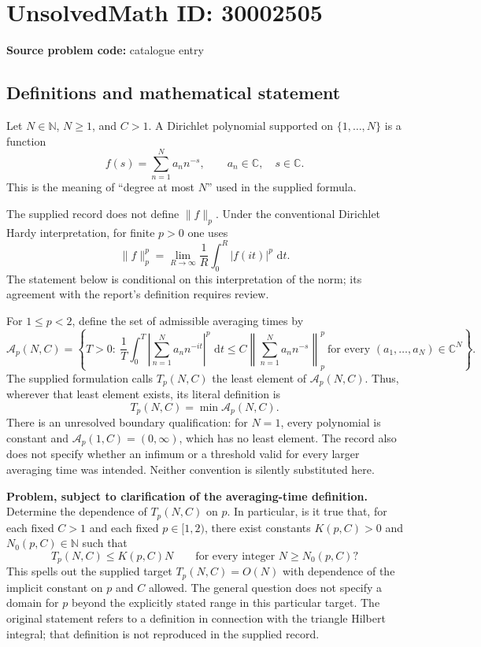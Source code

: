 \documentclass[11pt]{article}
\newcommand{\N}{\mathbb{N}}
\newcommand{\C}{\mathbb{C}}
\newcommand{\dd}{\,\mathrm{d}}
\begin{document}
\section*{UnsolvedMath ID: 30002505}
\textbf{Source problem code:} catalogue entry
\subsection{Definitions and mathematical statement}
Let \(N\in\N\), \(N\geq1\), and \(C>1\). A Dirichlet polynomial supported on \(\{1,\ldots,N\}\) is a function
\[
f(s)=\sum_{n=1}^{N}a_n n^{-s},\qquad a_n\in\C,\quad s\in\C.
\]
This is the meaning of ``degree at most \(N\)'' used in the supplied formula.

The supplied record does not define \(\|f\|_p\). Under the conventional Dirichlet Hardy interpretation, for finite \(p>0\) one uses
\[
\|f\|_p^p=\lim_{R\to\infty}\frac1R\int_0^R|f(it)|^p\,\dd t.
\]
The statement below is conditional on this interpretation of the norm; its agreement with the report's definition requires review.

For \(1\leq p<2\), define the set of admissible averaging times by
\[
\mathcal A_p(N,C)=\left\{T>0:\ \frac1T\int_0^T\left|\sum_{n=1}^{N}a_n n^{-it}\right|^p\,\dd t
\leq C\left\|\sum_{n=1}^{N}a_n n^{-s}\right\|_p^p
\ \text{for every }(a_1,\ldots,a_N)\in\C^N\right\}.
\]
The supplied formulation calls \(T_p(N,C)\) the least element of \(\mathcal A_p(N,C)\). Thus, wherever that least element exists, its literal definition is
\[
T_p(N,C)=\min\mathcal A_p(N,C).
\]
There is an unresolved boundary qualification: for \(N=1\), every polynomial is constant and \(\mathcal A_p(1,C)=(0,\infty)\), which has no least element. The record also does not specify whether an infimum or a threshold valid for every larger averaging time was intended. Neither convention is silently substituted here.

\textbf{Problem, subject to clarification of the averaging-time definition.} Determine the dependence of \(T_p(N,C)\) on \(p\). In particular, is it true that, for each fixed \(C>1\) and each fixed \(p\in[1,2)\), there exist constants \(K(p,C)>0\) and \(N_0(p,C)\in\N\) such that
\[
T_p(N,C)\leq K(p,C)N\qquad\text{for every integer }N\geq N_0(p,C)?
\]
This spells out the supplied target \(T_p(N,C)=O(N)\) with dependence of the implicit constant on \(p\) and \(C\) allowed. The general question does not specify a domain for \(p\) beyond the explicitly stated range in this particular target. The original statement refers to a definition in connection with the triangle Hilbert integral; that definition is not reproduced in the supplied record.
\end{document}

